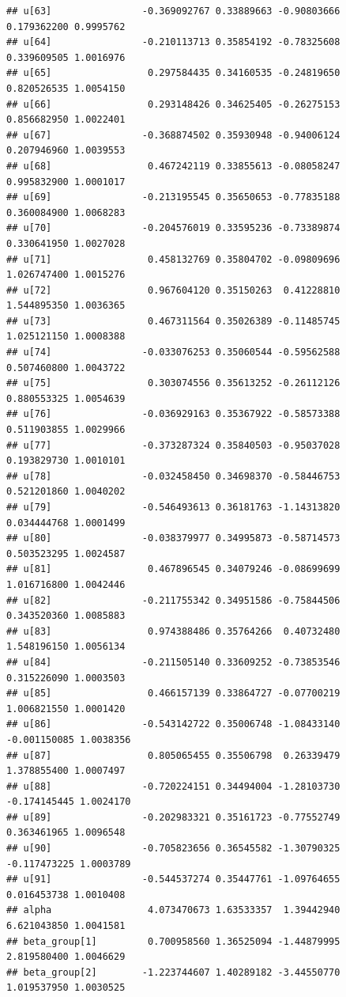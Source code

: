 \documentclass[
]{book}
\begin{document}
\begin{verbatim}
## u[63]                -0.369092767 0.33889663 -0.90803666  0.179362200 0.9995762
## u[64]                -0.210113713 0.35854192 -0.78325608  0.339609505 1.0016976
## u[65]                 0.297584435 0.34160535 -0.24819650  0.820526535 1.0054150
## u[66]                 0.293148426 0.34625405 -0.26275153  0.856682950 1.0022401
## u[67]                -0.368874502 0.35930948 -0.94006124  0.207946960 1.0039553
## u[68]                 0.467242119 0.33855613 -0.08058247  0.995832900 1.0001017
## u[69]                -0.213195545 0.35650653 -0.77835188  0.360084900 1.0068283
## u[70]                -0.204576019 0.33595236 -0.73389874  0.330641950 1.0027028
## u[71]                 0.458132769 0.35804702 -0.09809696  1.026747400 1.0015276
## u[72]                 0.967604120 0.35150263  0.41228810  1.544895350 1.0036365
## u[73]                 0.467311564 0.35026389 -0.11485745  1.025121150 1.0008388
## u[74]                -0.033076253 0.35060544 -0.59562588  0.507460800 1.0043722
## u[75]                 0.303074556 0.35613252 -0.26112126  0.880553325 1.0054639
## u[76]                -0.036929163 0.35367922 -0.58573388  0.511903855 1.0029966
## u[77]                -0.373287324 0.35840503 -0.95037028  0.193829730 1.0010101
## u[78]                -0.032458450 0.34698370 -0.58446753  0.521201860 1.0040202
## u[79]                -0.546493613 0.36181763 -1.14313820  0.034444768 1.0001499
## u[80]                -0.038379977 0.34995873 -0.58714573  0.503523295 1.0024587
## u[81]                 0.467896545 0.34079246 -0.08699699  1.016716800 1.0042446
## u[82]                -0.211755342 0.34951586 -0.75844506  0.343520360 1.0085883
## u[83]                 0.974388486 0.35764266  0.40732480  1.548196150 1.0056134
## u[84]                -0.211505140 0.33609252 -0.73853546  0.315226090 1.0003503
## u[85]                 0.466157139 0.33864727 -0.07700219  1.006821550 1.0001420
## u[86]                -0.543142722 0.35006748 -1.08433140 -0.001150085 1.0038356
## u[87]                 0.805065455 0.35506798  0.26339479  1.378855400 1.0007497
## u[88]                -0.720224151 0.34494004 -1.28103730 -0.174145445 1.0024170
## u[89]                -0.202983321 0.35161723 -0.77552749  0.363461965 1.0096548
## u[90]                -0.705823656 0.36545582 -1.30790325 -0.117473225 1.0003789
## u[91]                -0.544537274 0.35447761 -1.09764655  0.016453738 1.0010408
## alpha                 4.073470673 1.63533357  1.39442940  6.621043850 1.0041581
## beta_group[1]         0.700958560 1.36525094 -1.44879995  2.819580400 1.0046629
## beta_group[2]        -1.223744607 1.40289182 -3.44550770  1.019537950 1.0030525

\end{verbatim}
\end{document}
